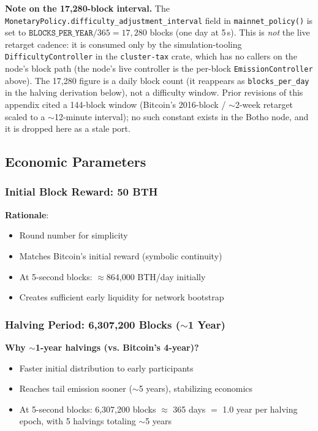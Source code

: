 \textbf{Note on the 17{,}280-block interval.} The
\texttt{MonetaryPolicy.difficulty\_adjustment\_interval} field in
\texttt{mainnet\_policy()} is set to $\texttt{BLOCKS\_PER\_YEAR}/365 = 17{,}280$
blocks (one day at 5\,s). This is \emph{not} the live retarget cadence: it is
consumed only by the simulation-tooling \texttt{DifficultyController} in the
\texttt{cluster-tax} crate, which has no callers on the node's block path (the
node's live controller is the per-block \texttt{EmissionController} above). The
17{,}280 figure is a daily block count (it reappears as \texttt{blocks\_per\_day}
in the halving derivation below), not a difficulty window. Prior revisions of
this appendix cited a 144-block window (Bitcoin's 2016-block / $\sim$2-week
retarget scaled to a $\sim$12-minute interval); no such constant exists in the
Botho node, and it is dropped here as a stale port.

\subsection{Economic Parameters}

\subsubsection{Initial Block Reward: 50 BTH}

\textbf{Rationale}:
\begin{itemize}
  \item Round number for simplicity
  \item Matches Bitcoin's initial reward (symbolic continuity)
  \item At 5-second blocks: $\approx$864,000 BTH/day initially
  \item Creates sufficient early liquidity for network bootstrap
\end{itemize}

\subsubsection{Halving Period: 6,307,200 Blocks ($\sim$1 Year)}

\textbf{Why $\sim$1-year halvings (vs. Bitcoin's 4-year)?}
\begin{itemize}
  \item Faster initial distribution to early participants
  \item Reaches tail emission sooner ($\sim$5 years), stabilizing economics
  \item At 5-second blocks: 6,307,200 blocks $\approx$ 365 days $=$ 1.0 year
    per halving epoch, with 5 halvings totaling $\sim$5 years
\end{itemize}

